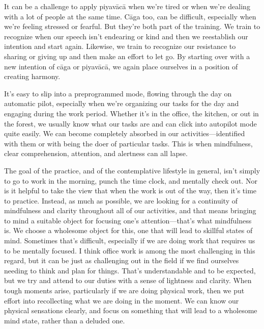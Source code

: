 It can be a challenge to apply piyavācā when we're tired or when 
we're dealing with a lot of people at the same time. Cāga too, can be 
difficult, especially when we're feeling stressed or fearful. But 
they're both part of the training. We train to recognize when our 
speech isn't endearing or kind and then we reestablish our intention 
and start again. Likewise, we train to recognize our resistance to 
sharing or giving up and then make an effort to let go. By starting 
over with a new intention of cāga or piyavācā, we again place 
ourselves in a position of creating harmony.


It's easy to slip into a preprogrammed mode, flowing through the day on 
automatic pilot, especially when we're organizing our tasks for the day 
and engaging during the work period. Whether it's in the office, the 
kitchen, or out in the forest, we usually know what our tasks are and 
can click into autopilot mode quite easily. We can become completely 
absorbed in our activities---identified with them or with being the 
doer of particular tasks. This is when mindfulness, clear 
comprehension, attention, and alertness can all lapse.

The goal of the practice, and of the contemplative lifestyle in 
general, isn't simply to go to work in the morning, punch the time 
clock, and mentally check out. Nor is it helpful to take the view that 
when the work is out of the way, then it's time to practice. Instead, 
as much as possible, we are looking for a continuity of mindfulness and 
clarity throughout all of our activities, and that means bringing to 
mind a suitable object for focusing one's attention---that's what 
mindfulness is. We choose a wholesome object for this, one that will 
lead to skillful states of mind. Sometimes that's difficult, especially 
if we are doing work that requires us to be mentally focused. I think 
office work is among the most challenging in this regard, but it can be 
just as challenging out in the field if we find ourselves needing to 
think and plan for things. That's understandable and to be expected, 
but we try and attend to our duties with a sense of lightness and 
clarity. When tough moments arise, particularly if we are doing 
physical work, then we put effort into recollecting what we are doing 
in the moment. We can know our physical sensations clearly, and focus 
on something that will lead to a wholesome mind state, rather than a 
deluded one.

